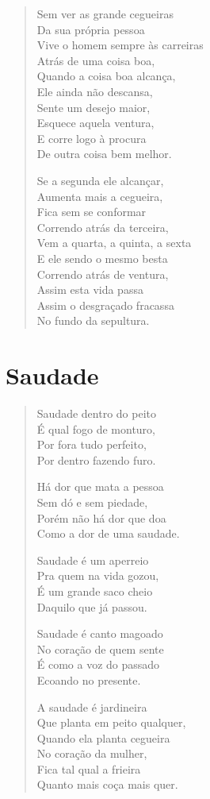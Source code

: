 \begin{verse}
Sem ver as grande cegueiras\\
Da sua própria pessoa\\
Vive o homem sempre às carreiras\\
Atrás de uma coisa boa,\\
Quando a coisa boa alcança,\\
Ele ainda não descansa,\\
Sente um desejo maior,\\
Esquece aquela ventura,\\
E corre logo à procura\\
De outra coisa bem melhor.

Se a segunda ele alcançar,\\
Aumenta mais a cegueira,\\
Fica sem se conformar\\
Correndo atrás da terceira,\\
Vem a quarta, a quinta, a sexta\\
E ele sendo o mesmo besta\\
Correndo atrás de ventura,\\
Assim esta vida passa\\
Assim o desgraçado fracassa\\
No fundo da sepultura.
\end{verse}

\chapter{Saudade}

\begin{verse}
Saudade dentro do peito\\
É qual fogo de monturo,\\
Por fora tudo perfeito,\\
Por dentro fazendo furo.

Há dor que mata a pessoa\\
Sem dó e sem piedade,\\
Porém não há dor que doa\\
Como a dor de uma saudade.

Saudade é um aperreio\\
Pra quem na vida gozou,\\
É um grande saco cheio\\
Daquilo que já passou.

Saudade é canto magoado\\
No coração de quem sente\\
É como a voz do passado\\
Ecoando no presente.

A saudade é jardineira\\
Que planta em peito qualquer,\\
Quando ela planta cegueira\\
No coração da mulher,\\
Fica tal qual a frieira\\
Quanto mais coça mais quer.
\end{verse}

